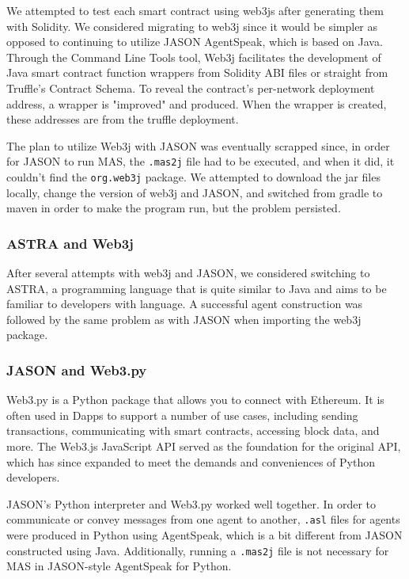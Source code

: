 We attempted to test each smart contract using web3js after generating them with Solidity. We considered migrating to web3j since it would be simpler as opposed to continuing to utilize JASON AgentSpeak, which is based on Java. Through the Command Line Tools tool, Web3j facilitates the development of Java smart contract function wrappers from Solidity ABI files or straight from Truffle's Contract Schema. To reveal the contract's per-network deployment address, a wrapper is "improved" and produced. When the wrapper is created, these addresses are from the truffle deployment.

\vspace{.5cm}

The plan to utilize Web3j with JASON was eventually scrapped since, in order for JASON to run \ac{MAS}, the \texttt{.mas2j} file had to be executed, and when it did, it couldn't find the \texttt{org.web3j} package. We attempted to download the jar files locally, change the version of web3j and JASON, and switched from gradle to maven in order to make the program run, but the problem persisted.

\subsubsection{ASTRA and Web3j}

After several attempts with web3j and JASON, we considered switching to ASTRA, a programming language that is quite similar to Java and aims to be familiar to developers with language. A successful agent construction was followed by the same problem as with JASON when importing the web3j package.

\subsubsection{JASON and Web3.py}

Web3.py is a Python package that allows you to connect with Ethereum. It is often used in \ac{Dapp}s to support a number of use cases, including sending transactions, communicating with smart contracts, accessing block data, and more. The Web3.js JavaScript \ac{API} served as the foundation for the original \ac{API}, which has since expanded to meet the demands and conveniences of Python developers.

\vspace{.5cm}

JASON's Python interpreter and Web3.py worked well together. In order to communicate or convey messages from one agent to another, \texttt{.asl} files for agents were produced in Python using AgentSpeak, which is a bit different from JASON constructed using Java. Additionally, running a \texttt{.mas2j} file is not necessary for \ac{MAS} in JASON-style AgentSpeak for Python.

